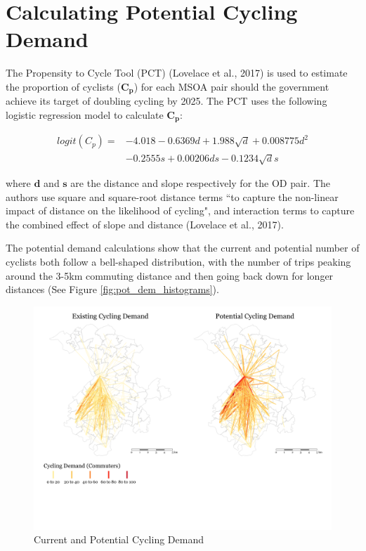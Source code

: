 \documentclass[]{elsarticle} %
\begin{document}
\hypertarget{calculating-potential-cycling-demand}{%
\section{Calculating Potential Cycling
Demand}\label{calculating-potential-cycling-demand}}

The Propensity to Cycle Tool (PCT) (Lovelace et al., 2017) is used to
estimate the proportion of cyclists (\(\boldsymbol{C_{p}}\)) for each
MSOA pair should the government achieve its target of doubling cycling
by 2025. The PCT uses the following logistic regression model to
calculate \(\boldsymbol{C_{p}}\):

\begin{align}\label{eq:pcteqn}
     logit(C_{p}) = & -4.018 - 0.6369d +  1.988\sqrt{d} + 0.008775d^2\\ & - 0.2555s + 0.00206ds -0.1234\sqrt{d}s\nonumber 
\end{align}

\noindent where \(\boldsymbol{d}\) and \(\boldsymbol{s}\) are the
distance and slope respectively for the OD pair. The authors use square
and square-root distance terms ``to capture the non-linear impact of
distance on the likelihood of cycling", and interaction terms to capture
the combined effect of slope and distance (Lovelace et al., 2017).

The potential demand calculations show that the current and potential
number of cyclists both follow a bell-shaped distribution, with the
number of trips peaking around the 3-5km commuting distance and then
going back down for longer distances (See Figure
\ref{fig:pot_dem_histograms}).

\begin{figure}[h!]
    \centering %
    \includegraphics[width=.6\textwidth]{../../data/Manchester/Plots/desire_facet_cycling.png} 
    \caption{Current and Potential Cycling Demand} 
    \label{fig:desire_facet_cycling} 
\end{figure}
\end{document}
